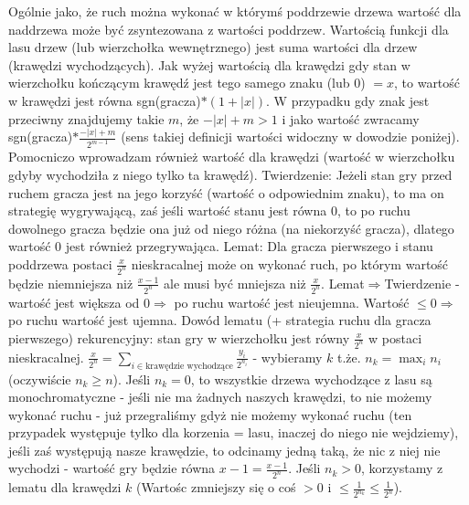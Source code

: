 \documentclass{article}
\begin{document}
Ogólnie jako, że ruch można wykonać w którymś poddrzewie drzewa wartość dla naddrzewa może być zsyntezowana z wartości poddrzew.\newline
Wartością funkcji dla lasu drzew (lub wierzchołka wewnętrznego) jest suma wartości dla drzew (krawędzi wychodzących).
Jak wyżej wartością dla krawędzi gdy stan w wierzchołku kończącym krawędź jest tego samego znaku (lub $0$) $=x$,
to wartość w krawędzi jest równa sgn(gracza)$*(1+|x|)$. W przypadku gdy znak jest przeciwny znajdujemy takie $m$, że $-|x|+m>1$
i jako wartość zwracamy sgn(gracza)$*\frac{-|x|+m}{2^{m-1}}$ (sens takiej definicji wartości widoczny w dowodzie poniżej).\newline
Pomocniczo wprowadzam również wartość dla krawędzi (wartość w wierzchołku gdyby wychodziła z niego tylko ta krawędź).\newline
Twierdzenie: Jeżeli stan gry przed ruchem gracza jest na jego korzyść (wartość o odpowiednim znaku), to ma on strategię wygrywającą, zaś jeśli wartość stanu jest równa $0$,
to po ruchu dowolnego gracza będzie ona już od niego różna (na niekorzyść gracza), dlatego wartość $0$ jest również przegrywająca.\newline
Lemat: Dla gracza pierwszego i stanu poddrzewa postaci $\frac{x}{2^n}$ nieskracalnej może on wykonać ruch,
po którym wartość będzie niemniejsza niż $\frac{x-1}{2^n}$ ale musi być mniejsza niż $\frac{x}{2^n}$.\newline
Lemat$\Rightarrow$Twierdzenie - wartość jest większa od $0\Rightarrow$ po ruchu wartość jest nieujemna.
Wartość $\le0\Rightarrow$ po ruchu wartość jest ujemna.\newline
Dowód lematu (+ strategia ruchu dla gracza pierwszego) rekurencyjny: stan gry w wierzchołku jest równy $\frac{x}{2^n}$ w postaci nieskracalnej.
$\frac{x}{2^n}=\sum\limits_{i\in\text{krawędzie wychodzące}}\frac{y_i}{2^{n_i}}$ - wybieramy $k$ t.że. $n_k=\max_{i}{n_i}$ (oczywiście $n_k\ge n$).\newline
Jeśli $n_k=0$, to wszystkie drzewa wychodzące z lasu są monochromatyczne - jeśli nie ma żadnych naszych krawędzi,
to nie możemy wykonać ruchu - już przegraliśmy gdyż nie możemy wykonać ruchu
(ten przypadek występuje tylko dla korzenia = lasu, inaczej do niego nie wejdziemy),
jeśli zaś występują nasze krawędzie, to odcinamy jedną taką, że nic z niej nie wychodzi - wartość gry będzie równa $x-1=\frac{x-1}{2^n}$.\newline
Jeśli $n_k>0$, korzystamy z lematu dla krawędzi $k$ (Wartośc zmniejszy się o coś $>0$ i $\le\frac{1}{2^{n_k}}\le\frac{1}{2^n}$).\newline
\end{document}
